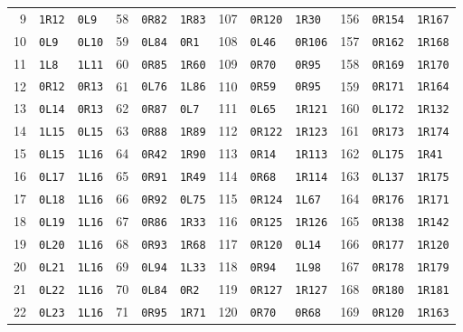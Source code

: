 \begin{center}
\begin{tabular}{@{}rll@{\hspace{4mm}}rll@{\hspace{4mm}}rll@{\hspace{4mm}}rll@{}}
9 & \texttt{1R12} & \texttt{0L9} & 58 & \texttt{0R82} & \texttt{1R83} & 107 & \texttt{0R120} & \texttt{1R30} & 156 & \texttt{0R154} & \texttt{1R167}\\
10 & \texttt{0L9} & \texttt{0L10} & 59 & \texttt{0L84} & \texttt{0R1} & 108 & \texttt{0L46} & \texttt{0R106} & 157 & \texttt{0R162} & \texttt{1R168}\\
11 & \texttt{1L8} & \texttt{1L11} & 60 & \texttt{0R85} & \texttt{1R60} & 109 & \texttt{0R70} & \texttt{0R95} & 158 & \texttt{0R169} & \texttt{1R170}\\
12 & \texttt{0R12} & \texttt{0R13} & 61 & \texttt{0L76} & \texttt{1L86} & 110 & \texttt{0R59} & \texttt{0R95} & 159 & \texttt{0R171} & \texttt{1R164}\\
13 & \texttt{0L14} & \texttt{0R13} & 62 & \texttt{0R87} & \texttt{0L7} & 111 & \texttt{0L65} & \texttt{1R121} & 160 & \texttt{0L172} & \texttt{1R132}\\
14 & \texttt{1L15} & \texttt{0L15} & 63 & \texttt{0R88} & \texttt{1R89} & 112 & \texttt{0R122} & \texttt{1R123} & 161 & \texttt{0R173} & \texttt{1R174}\\
15 & \texttt{0L15} & \texttt{1L16} & 64 & \texttt{0R42} & \texttt{1R90} & 113 & \texttt{0R14} & \texttt{1R113} & 162 & \texttt{0L175} & \texttt{1R41}\\
16 & \texttt{0L17} & \texttt{1L16} & 65 & \texttt{0R91} & \texttt{1R49} & 114 & \texttt{0R68} & \texttt{1R114} & 163 & \texttt{0L137} & \texttt{1R175}\\
17 & \texttt{0L18} & \texttt{1L16} & 66 & \texttt{0R92} & \texttt{0L75} & 115 & \texttt{0R124} & \texttt{1L67} & 164 & \texttt{0R176} & \texttt{1R171}\\
18 & \texttt{0L19} & \texttt{1L16} & 67 & \texttt{0R86} & \texttt{1R33} & 116 & \texttt{0R125} & \texttt{1R126} & 165 & \texttt{0R138} & \texttt{1R142}\\
19 & \texttt{0L20} & \texttt{1L16} & 68 & \texttt{0R93} & \texttt{1R68} & 117 & \texttt{0R120} & \texttt{0L14} & 166 & \texttt{0R177} & \texttt{1R120}\\
20 & \texttt{0L21} & \texttt{1L16} & 69 & \texttt{0L94} & \texttt{1L33} & 118 & \texttt{0R94} & \texttt{1L98} & 167 & \texttt{0R178} & \texttt{1R179}\\
21 & \texttt{0L22} & \texttt{1L16} & 70 & \texttt{0L84} & \texttt{0R2} & 119 & \texttt{0R127} & \texttt{1R127} & 168 & \texttt{0R180} & \texttt{1R181}\\
22 & \texttt{0L23} & \texttt{1L16} & 71 & \texttt{0R95} & \texttt{1R71} & 120 & \texttt{0R70} & \texttt{0R68} & 169 & \texttt{0R120} & \texttt{1R163}\\

\end{tabular}
\end{center}
